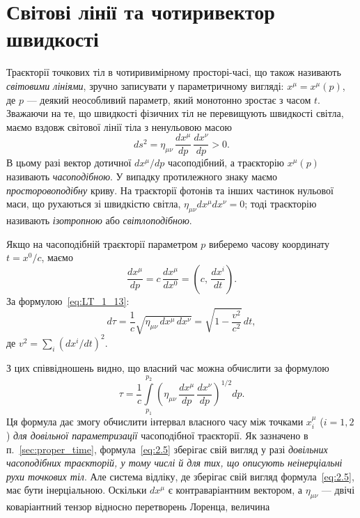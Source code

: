 \section{Світові лінії та чотиривектор швидкості}

Траєкторії точкових тіл в чотиривимірному просторі-часі, що також називають \textit{світовими лініями}, зручно
записувати у параметричному вигляді: $x^\mu = x^\mu(p)$, де $p$ --- деякий неособливий параметр, який монотонно зростає
з часом $t$. Зважаючи на те, що швидкості фізичних тіл не перевищують швидкості світла, маємо вздовж світової лінії тіла
з ненульовою масою
\begin{equation*}
  ds^2 = \eta_{\mu\nu}\,\frac{dx^\mu}{dp}\,\frac{dx^\nu}{dp} > 0.
\end{equation*}
В цьому разі вектор дотичної $dx^\mu/dp$ часоподібний, а траєкторію $x^\mu(p)$ називають \textit{часоподібною}. У
випадку протилежного знаку маємо \textit{просторовоподібну} криву. На траєкторії фотонів та інших частинок нульової
маси, що рухаються зі швидкістю світла, $\eta_{\mu\nu}dx^\mu dx^\nu = 0$; тоді траєкторію називають \textit{ізотропною}
або \textit{світлоподібною}.

Якщо на часоподібній траєкторії параметром $p$ виберемо часову координату $t = x^0/c$, маємо
\begin{equation*}
  \frac{dx^\mu}{dp} = c\,\frac{dx^\mu}{dx^0} = \left(c,\,\frac{dx^i}{dt}\right).
\end{equation*}
За формулою~\eqref{eq:LT_1_13}:
\begin{equation*}
  d\tau = \frac{1}{c}\sqrt{\eta_{\mu\nu}\,dx^\mu\,dx^\nu}
  = \sqrt{1 - \frac{v^2}{c^2}}\,dt,
\end{equation*}
де $v^2 = \sum_i (dx^i/dt)^2$.

З цих співвідношень видно, що власний час можна обчислити за формулою
\begin{equation}  \label{eq:2.5}
  \tau = \frac{1}{c}\int\limits_{p_1}^{p_2}
  \left(\eta_{\mu\nu}\,\frac{dx^\mu}{dp}\,\frac{dx^\nu}{dp}\right)^{1/2}dp.
\end{equation}
Ця формула дає змогу обчислити інтервал власного часу між точками $x_i^\mu$ ($i=1,2$) \textit{для довільної
параметризації} часоподібної траєкторії. Як зазначено в п.~\ref{sec:proper_time}, формула~\eqref{eq:2.5} зберігає свій
вигляд у разі \textit{довільних часоподібних траєкторій, у тому числі й для тих, що описують неінерціальні рухи точкових
тіл}. Але система відліку, де зберігає свій вигляд формула~\eqref{eq:2.5}, має бути інерціальною. Оскільки $dx^\mu$ є
контраваріантним вектором, а $\eta_{\mu\nu}$ --- двічі коваріантний тензор відносно перетворень Лоренца, величина

